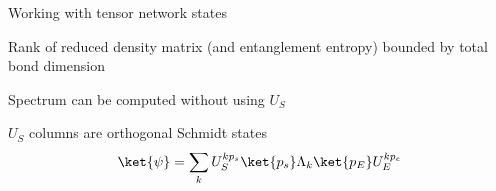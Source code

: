 \begin{frame}{Working with tensor network states}
\bi 
\item Rank of reduced density matrix (and entanglement entropy) bounded by total bond dimension
\begin{figure}
\raggedright

\end{figure}
\item Spectrum can be computed without using $U_S$
\item $U_S$ columns are orthogonal Schmidt states
$$
\ket{\psi} = \sum\limits_k U_S^{k p_s} \ket{p_s} \Lambda_k \ket{p_E} U_E^{k p_e}
$$
\ei 
\end{frame}